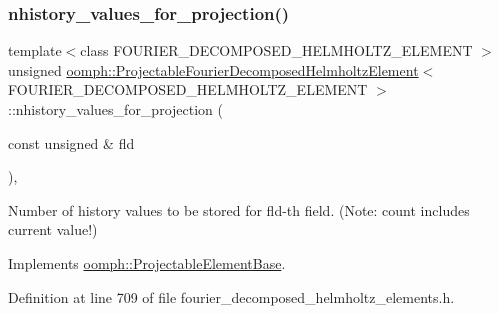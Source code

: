 \subsubsection{\texorpdfstring{nhistory\+\_\+values\+\_\+for\+\_\+projection()}{nhistory\_values\_for\_projection()}}
{\footnotesize\ttfamily template$<$class F\+O\+U\+R\+I\+E\+R\+\_\+\+D\+E\+C\+O\+M\+P\+O\+S\+E\+D\+\_\+\+H\+E\+L\+M\+H\+O\+L\+T\+Z\+\_\+\+E\+L\+E\+M\+E\+NT $>$ \\
unsigned \hyperlink{classoomph_1_1ProjectableFourierDecomposedHelmholtzElement}{oomph\+::\+Projectable\+Fourier\+Decomposed\+Helmholtz\+Element}$<$ F\+O\+U\+R\+I\+E\+R\+\_\+\+D\+E\+C\+O\+M\+P\+O\+S\+E\+D\+\_\+\+H\+E\+L\+M\+H\+O\+L\+T\+Z\+\_\+\+E\+L\+E\+M\+E\+NT $>$\+::nhistory\+\_\+values\+\_\+for\+\_\+projection (\begin{DoxyParamCaption}\item[{const unsigned \&}]{fld }\end{DoxyParamCaption})\hspace{0.3cm}{\ttfamily [inline]}, {\ttfamily [virtual]}}



Number of history values to be stored for fld-\/th field. (Note\+: count includes current value!) 



Implements \hyperlink{classoomph_1_1ProjectableElementBase_ac6790f394630b964663281f8740f43a5}{oomph\+::\+Projectable\+Element\+Base}.



Definition at line 709 of file fourier\+\_\+decomposed\+\_\+helmholtz\+\_\+elements.\+h.

\mbox{\label{classoomph_1_1ProjectableFourierDecomposedHelmholtzElement_ad01ff7bf92e3c532b9aeb83a11428782}} 
